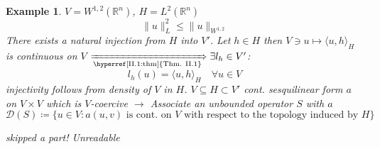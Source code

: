 \documentclass[12pt]{extreport} %
\newcommand{\R}{\mathbb{R}}
\newcommand{\DO}[1]{\mathcal{D}\left( {#1} \right)}
\theoremstyle{named}
\theoremstyle{nnamed}
\theoremstyle{itshape}
\theoremstyle{normal}
\newtheorem*{example}{Example}
\begin{document}
\begin{example}
	$V = W^{1,2}(\R^n)$, $H = L^2(\R^n)$
 		$$ \| u \|_L^2 \leq \| u \|_{W^{1,2}} $$	
 	There exists a natural injection from $H$ into $V'$. Let $h \in H$ then $V \ni u \mapsto \langle u, h \rangle_H$ is continuous on $V$ $\xRightarrow[\text{\hyperref[II.1:thm]{Thm. II.1}}]{} \exists l_h \in V'$:
 		$$ l_h(u) = \langle u, h \rangle_H \quad \forall u \in V $$
 	injectivity follows from density of $V$ in $H$. $V \subseteq H \subset V'$ cont. sesquilinear form $a$ on $V \times V$ which is $V$-coercive $\rightarrow$ Associate an unbounded operator $S$ with $a$
 		$$ \DO{S} \coloneqq \big\{ u \in V \colon a(u, v) \text{ is cont. on } V \text{ with respect to the topology induced by } H \big\} $$
\end{example}

\begin{center}
	\textit{\color{red} skipped a part! Unreadable}
\end{center} %
\end{document}
